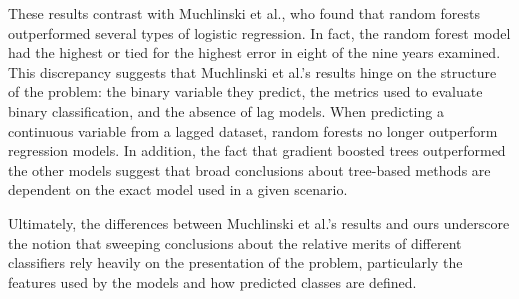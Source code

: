 \documentclass{article}
\begin{document}
These results contrast with Muchlinski et al., who found that random forests outperformed several types of logistic regression. In fact, the random forest model had the highest or tied for the highest error in eight of the nine years examined. This discrepancy suggests that Muchlinski et al.'s results hinge on the structure of the problem: the binary variable they predict, the metrics used to evaluate binary classification, and the absence of lag models. When predicting a continuous variable from a lagged dataset, random forests no longer outperform regression models. In addition, the fact that gradient boosted trees outperformed the other models suggest that broad conclusions about tree-based methods are dependent on the exact model used in a given scenario.

Ultimately, the differences between Muchlinski et al.'s results and ours underscore the notion that sweeping conclusions about the relative merits of different classifiers rely heavily on the presentation of the problem, particularly the features used by the models and how predicted classes are defined.

\vspace{20px}

\nocite{ucdp}
\renewcommand\refname{Bibliography}


\end{document}
